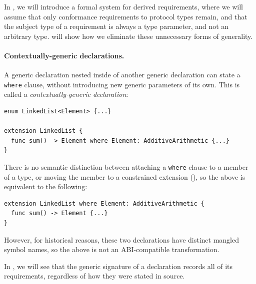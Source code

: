 \documentclass[../generics]{subfiles}
\begin{document}
In , we will introduce a formal system for derived requirements, where we will assume that only conformance requirements to protocol types remain, and that the subject type of a requirement is always a type parameter, and not an arbitrary type.  will show how we eliminate these unnecessary forms of generality.

\paragraph{Contextually-generic declarations.} A generic declaration nested inside of another generic declaration can state a \texttt{where} clause, without introducing new generic parameters of its own. This is called a \emph{contextually-generic declaration}:
\begin{Verbatim}
enum LinkedList<Element> {...}

extension LinkedList {
  func sum() -> Element where Element: AdditiveArithmetic {...}
}
\end{Verbatim}
There is no semantic distinction between attaching a \texttt{where} clause to a member of a type, or moving the member to a constrained extension (), so the above is equivalent to the following:
\begin{Verbatim}
extension LinkedList where Element: AdditiveArithmetic {
  func sum() -> Element {...}
}
\end{Verbatim}
However, for historical reasons, these two declarations have distinct mangled symbol names, so the above is not an ABI-compatible transformation.

\medskip

In , we will see that the generic signature of a declaration records all of its requirements, regardless of how they were stated in source.
\end{document}
